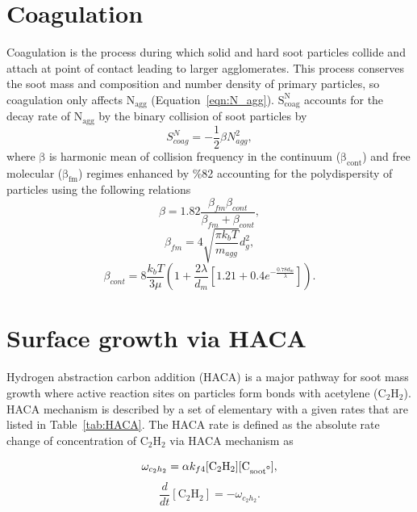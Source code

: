 \section{Coagulation}
Coagulation is the process during which solid and hard soot particles collide and attach at point of contact leading to larger agglomerates. This process conserves the soot mass and composition and number density of primary particles, so coagulation only affects $\mathrm{N_{agg}}$ (Equation~\eqref{eqn:N_agg}). $\mathrm{S^N_{coag}}$ accounts for the decay rate of $\mathrm{N_{agg}}$ by the binary collision of soot particles by
\begin{equation}
	S^N_{coag} = -\frac{1}{2}\beta N^2_{agg}
	\label{eqn:Scoag},
\end{equation}
where $\mathrm{\beta}$ is harmonic mean of collision frequency in the continuum ($\mathrm{\beta_{cont}}$) and free molecular ($\mathrm{\beta_{fm}}$) regimes enhanced by \%82 accounting for the polydispersity of particles using the following relations
\begin{equation}
	\beta = 1.82\frac{\beta_{fm}\beta_{cont}}{\beta_{fm}+\beta_{cont}}
	\label{eqn:beta},
\end{equation}
\begin{equation}
	\beta_{fm} = 4\sqrt{\frac{\pi k_b T}{m_{agg}}} d^2_g
	\label{eqn:betafm},
\end{equation}
\begin{equation}
	\beta_{cont} = 8\frac{k_b T}{3\mu} \left( 1+\frac{2\lambda}{d_m}
	\left[
	1.21 + 0.4e^{-\frac{0.78 d_m}{\lambda}}
	\right]
	\right)
	\label{eqn:betacont}.
\end{equation}


\section{Surface growth via HACA}
Hydrogen abstraction carbon addition (HACA) is a major pathway for soot mass growth where active reaction sites on particles form bonds with acetylene ($\mathrm{C_2H_2}$). HACA mechanism \cite{appel2000kinetic} is described by a set of elementary with a given rates that are listed in Table~\ref{tab:HACA}.
The HACA rate is defined as the absolute rate change of concentration of $\mathrm{C_2H_2}$ via HACA mechanism as

\begin{equation}
	\omega_{c_2h_2} = \alpha k_{f4} [\mathrm{C_2H_2}][\mathrm{C_{soot\mbox{\textdegree}}}]
	\label{eqn:hacaRate},
\end{equation}
\begin{equation}
	\frac{d}{dt}\left[ {\mathrm{C_2H_2}} \right] = -\omega_{c_2h_2}
	\label{eqn:c2h2Rate}.
\end{equation}

